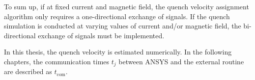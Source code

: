 To sum up, if at fixed current and magnetic field, the quench velocity assignment algorithm only requires a one-directional exchange of signals. If the quench simulation is conducted at varying values of current and/or magnetic field, the bi-directional exchange of signals must be implemented. 

In this thesis, the quench velocity is estimated numerically. In the following chapters, the communication times $t_j$ between ANSYS and the external routine are described as $t_\text{com}$.


